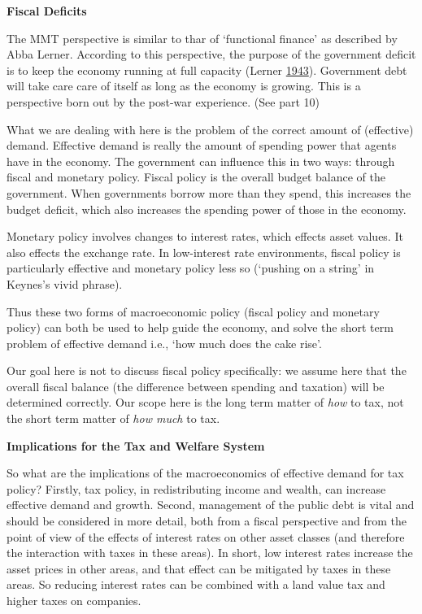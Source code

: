 \documentclass[]{tufte-handout}
\begin{document}
\textbf{Fiscal Deficits}

The MMT perspective is similar to thar of `functional finance' as
described by Abba Lerner. According to this perspective, the purpose of
the government deficit is to keep the economy running at full capacity
(Lerner \protect\hyperlink{ref-Lerner1943}{1943}). Government debt will
take care care of itself as long as the economy is growing. This is a
perspective born out by the post-war experience. (See part 10)

What we are dealing with here is the problem of the correct amount of
(effective) demand. Effective demand is really the amount of spending
power that agents have in the economy. The government can influence this
in two ways: through fiscal and monetary policy. Fiscal policy is the
overall budget balance of the government. When governments borrow more
than they spend, this increases the budget deficit, which also increases
the spending power of those in the economy.

Monetary policy involves changes to interest rates, which effects asset
values. It also effects the exchange rate. In low-interest rate
environments, fiscal policy is particularly effective and monetary
policy less so (`pushing on a string' in Keynes's vivid phrase).

Thus these two forms of macroeconomic policy (fiscal policy and monetary
policy) can both be used to help guide the economy, and solve the short
term problem of effective demand i.e., `how much does the cake rise'.

Our goal here is not to discuss fiscal policy specifically: we assume
here that the overall fiscal balance (the difference between spending
and taxation) will be determined correctly. Our scope here is the long
term matter of \emph{how} to tax, not the short term matter of \emph{how
much} to tax.

\textbf{Implications for the Tax and Welfare System}

So what are the implications of the macroeconomics of effective demand
for tax policy? Firstly, tax policy, in redistributing income and
wealth, can increase effective demand and growth. Second, management of
the public debt is vital and should be considered in more detail, both
from a fiscal perspective and from the point of view of the effects of
interest rates on other asset classes (and therefore the interaction
with taxes in these areas). In short, low interest rates increase the
asset prices in other areas, and that effect can be mitigated by taxes
in these areas. So reducing interest rates can be combined with a land
value tax and higher taxes on companies.
\end{document}
